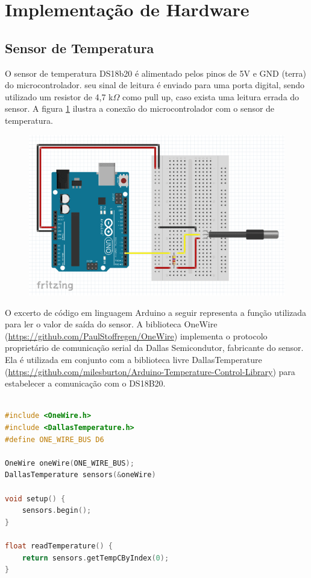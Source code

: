 \section{Implementação de Hardware}

\subsection{Sensor de Temperatura}

O sensor de temperatura DS18b20 é alimentado pelos pinos de 5V e GND (terra) do microcontrolador. seu sinal de leitura é enviado para uma porta digital, sendo utilizado um resistor de 4,7 k$\Omega$ como pull up, caso exista uma leitura errada do sensor. A figura \ref{fig:micro_temp} ilustra a conexão do microcontrolador com o sensor de temperatura. 


\begin{figure}[h]
    \centering
    \includegraphics[scale=0.40]{figuras/implementacao/hardware/DSsensor.png}
    \label{fig:micro_temp}
\end{figure}


O excerto de código em linguagem Arduino a seguir representa a função utilizada para ler o valor de saída do sensor. A biblioteca OneWire (\url{https://github.com/PaulStoffregen/OneWire}) implementa o protocolo proprietário de comunicação serial da Dallas Semicondutor, fabricante do sensor. Ela é utilizada em conjunto com a biblioteca livre DallasTemperature (\url{https://github.com/milesburton/Arduino-Temperature-Control-Library}) para estabelecer a comunicação com o DS18B20.

\begin{lstlisting}[language=C]

#include <OneWire.h>
#include <DallasTemperature.h>
#define ONE_WIRE_BUS D6

OneWire oneWire(ONE_WIRE_BUS);
DallasTemperature sensors(&oneWire)

void setup() {
    sensors.begin();
}

float readTemperature() {
    return sensors.getTempCByIndex(0);
}

\end{lstlisting}


